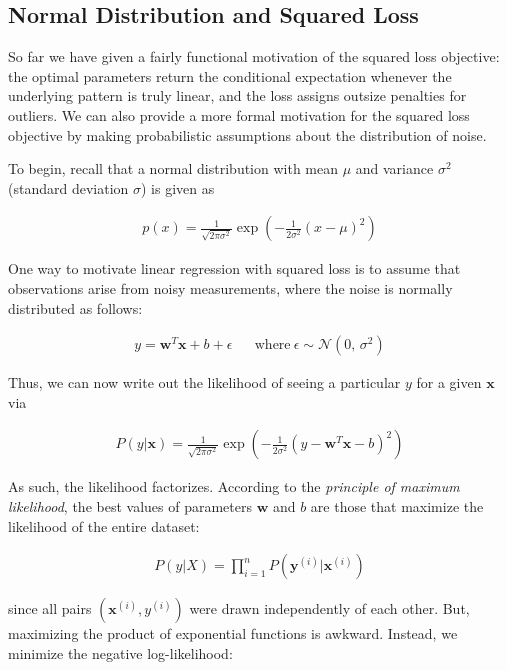 \documentclass[a4paper,12pt]{article}
\theoremstyle{definition}
\begin{document}
\subsection*{Normal Distribution and Squared Loss}
So far we have given a fairly functional motivation of the squared loss objective: the optimal parameters return the conditional expectation
whenever the underlying pattern is truly linear, and the loss assigns outsize penalties for outliers. We can also provide a more formal motivation for the squared loss objective by making probabilistic assumptions about the distribution of noise.

To begin, recall that a normal distribution with mean $\mu$ and variance $\sigma^2$ (standard deviation $\sigma$) is given as

\begin{align*}
    p(x) = \frac{1}{\sqrt{2\pi\sigma^2}}\exp({-\frac{1}{2\sigma^2}(x-\mu)^2})
\end{align*}

One way to motivate linear regression with squared loss is to assume that observations arise from noisy measurements, where the noise is normally distributed as follows:

\begin{align*}
    y = \mathbf{w}^T\mathbf{x} + b + \epsilon &  & \textrm{where}\ \epsilon \sim \mathcal{N}(0,\,\sigma^{2})
\end{align*}

Thus, we can now write out the likelihood of seeing a particular $y$ for a given $\mathbf{x}$ via

\begin{align*}
    P(y|\mathbf{x}) = \frac{1}{\sqrt{2\pi\sigma^2}}\exp({-\frac{1}{2\sigma^2}(y - \mathbf{w}^T\mathbf{x} - b)^2})
\end{align*}

As such, the likelihood factorizes. According to the \textit{principle of maximum likelihood}, the best values of parameters $\mathbf{w}$ and $b$
are those that maximize the likelihood of the entire dataset:

\begin{align*}
    P(y|X) = \prod_{i=1}^{n}P(\mathbf{y}^{(i)}|\mathbf{x}^{(i)})
\end{align*}

since all pairs $(\mathbf{x}^{(i)},y^{(i)})$ were drawn independently of each other. But, maximizing the product of exponential
functions is awkward. Instead, we minimize the negative log-likelihood:
\end{document}
